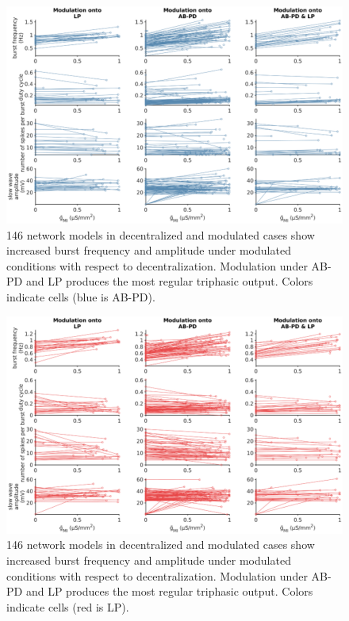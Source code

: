 \begin{figure}
	\centering
	\includegraphics[width=1.0\linewidth]{gfx/all-modulation/metrics_AB}
	\caption[All optimized ABPD models in decentralized and modulated cases]{146 network models in decentralized and modulated cases show increased burst frequency and amplitude under modulated conditions with respect to decentralization. Modulation under \acs{AB}-\acs{PD} and \acs{LP} produces the most regular triphasic output. Colors indicate cells (blue is \acs{AB}-\acs{PD}).}
	\label{fig:metricsab}
\end{figure}

\begin{figure}
	\centering
	\includegraphics[width=1.0\linewidth]{gfx/all-modulation/metrics_LP}
	\caption[All optimized ABPD models in decentralized and modulated cases]{146 network models in decentralized and modulated cases show increased burst frequency and amplitude under modulated conditions with respect to decentralization. Modulation under \acs{AB}-\acs{PD} and \acs{LP} produces the most regular triphasic output. Colors indicate cells (red is \acs{LP}).}
	\label{fig:metricslp}
\end{figure}

